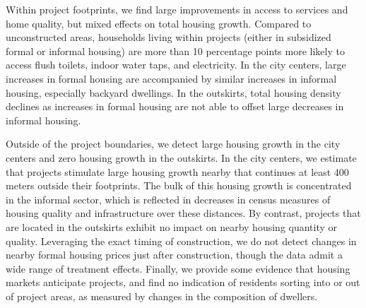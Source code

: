 \documentclass[12pt]{article}
\begin{document}


Within project footprints, we find large improvements in access to services and home quality, but mixed effects on total housing growth. Compared to unconstructed areas, households living within projects (either in subsidized formal or informal housing) are more than 10 percentage points more likely to access flush toilets, indoor water taps, and electricity.  In the city centers, large increases in formal housing are accompanied by similar increases in informal housing, especially backyard dwellings.  In the outskirts, total housing density declines as increases in formal housing are not able to offset large decreases in informal housing.


Outside of the project boundaries, we detect large housing growth in the city centers and zero housing growth in the outskirts.  In the city centers, we estimate that projects stimulate large housing growth nearby that continues at least 400 meters outside their footprints.  The bulk of this housing growth is concentrated in the informal sector, which is reflected in decreases in census measures of housing quality and infrastructure over these distances.  By contrast, projects that are located in the outskirts exhibit no impact on nearby housing quantity or quality.  Leveraging the exact timing of construction, we do not detect changes in nearby formal housing prices just after construction, though the data admit a wide range of treatment effects. Finally, we provide some evidence that housing markets anticipate projects, and find no indication of residents sorting into or out of project areas, as measured by changes in the composition of dwellers. 
\end{document}
